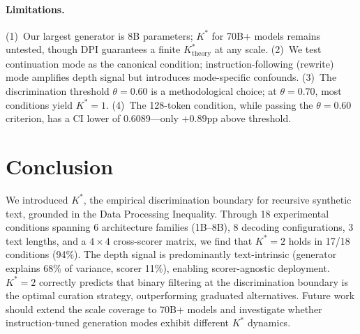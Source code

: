 \documentclass[11pt]{article}
\newcommand{\Kstar}{K^{*}}
\begin{document}
\paragraph{Limitations.}
(1)~Our largest generator is 8B parameters; $\Kstar$ for 70B+ models remains untested, though DPI guarantees a finite $\Kstar_{\mathrm{theory}}$ at any scale.
(2)~We test continuation mode as the canonical condition; instruction-following (rewrite) mode amplifies depth signal but introduces mode-specific confounds.
(3)~The discrimination threshold $\theta\!=\!0.60$ is a methodological choice; at $\theta\!=\!0.70$, most conditions yield $\Kstar\!=\!1$.
(4)~The 128-token condition, while passing the $\theta\!=\!0.60$ criterion, has a CI lower of 0.6089---only $+0.89$pp above threshold.

\section{Conclusion}
\label{sec:conclusion}

We introduced $\Kstar$, the empirical discrimination boundary for recursive synthetic text, grounded in the Data Processing Inequality.
Through 18 experimental conditions spanning 6 architecture families (1B--8B), 8 decoding configurations, 3 text lengths, and a $4\!\times\!4$ cross-scorer matrix, we find that $\Kstar\!=\!2$ holds in 17/18 conditions (94\%).
The depth signal is predominantly text-intrinsic (generator explains 68\% of variance, scorer 11\%), enabling scorer-agnostic deployment.
$\Kstar\!=\!2$ correctly predicts that binary filtering at the discrimination boundary is the optimal curation strategy, outperforming graduated alternatives.
Future work should extend the scale coverage to 70B+ models and investigate whether instruction-tuned generation modes exhibit different $\Kstar$ dynamics.
\end{document}
